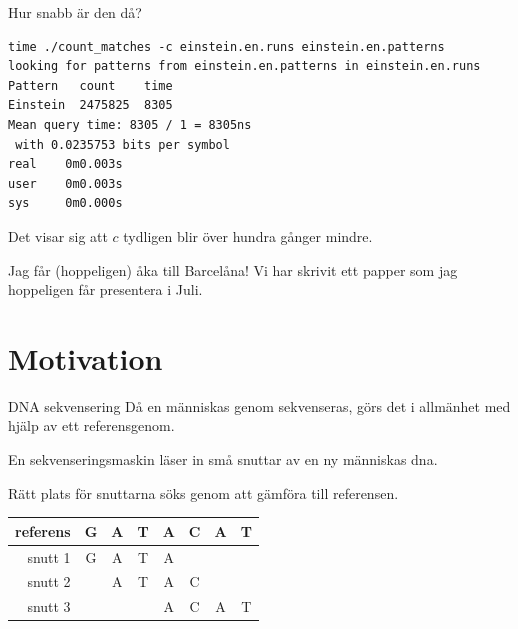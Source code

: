 \documentclass[11pt, aspectratio=169, table]{beamer}
\begin{document}
\begin{frame}[fragile]{Hur snabb är den då?}
\begin{verbatim}
time ./count_matches -c einstein.en.runs einstein.en.patterns
looking for patterns from einstein.en.patterns in einstein.en.runs
Pattern   count    time
Einstein  2475825  8305
Mean query time: 8305 / 1 = 8305ns
 with 0.0235753 bits per symbol
real    0m0.003s
user    0m0.003s
sys     0m0.000s
\end{verbatim}

Det visar sig att $c$ tydligen blir över hundra gånger mindre.
\end{frame}

\begin{frame}{Jag får (hoppeligen) åka till Barcelåna!}
\setlength{\parskip}{\fill}
Vi har skrivit ett papper som jag hoppeligen får presentera i Juli.
\end{frame}

\section{Motivation}
\begin{frame}{DNA sekvensering}
\setlength{\parskip}{\fill}
Då en människas genom sekvenseras, görs det i allmänhet med hjälp av ett referensgenom.

En sekvenseringsmaskin läser in små snuttar av en ny människas dna.

Rätt plats för snuttarna söks genom att gämföra till referensen.

\begin{center}
\tt \begin{tabular}{r|ccccccc}
\sf referens & G & A & T & A & C & A & T\\
\hline
\sf snutt 1 & G & A & T & A\\
\sf snutt 2 &   & A & T & A & C\\
\sf snutt 3 &   &   &   & A & C & A & T
\end{tabular}
\end{center}
\end{frame}
\end{document}
